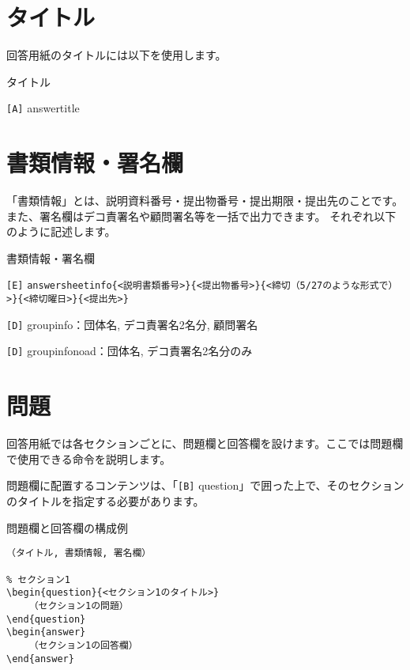 \begin{multicols*}{2}
\section{タイトル}
回答用紙のタイトルには以下を使用します。
\begin{framebox-simple}{タイトル}
    \begin{reitemize}
        \item \verb|[A]| answertitle
    \end{reitemize}
\end{framebox-simple}

\section{書類情報・署名欄}
「書類情報」とは、説明資料番号・提出物番号・提出期限・提出先のことです。また、署名欄はデコ責署名や顧問署名等を一括で出力できます。
それぞれ以下のように記述します。
\begin{framebox-simple}{書類情報・署名欄}
    \begin{reitemize}
        \item \verb|[E]| \verb|answersheetinfo{<説明書類番号>}{<提出物番号>}{<締切（5/27のような形式で）>}{<締切曜日>}{<提出先>}|
        \item \verb|[D]| groupinfo：団体名, デコ責署名2名分, 顧問署名
        \item \verb|[D]| groupinfonoad：団体名, デコ責署名2名分のみ
    \end{reitemize}
\end{framebox-simple}

\section{問題}
回答用紙では各セクションごとに、問題欄と回答欄を設けます。ここでは問題欄で使用できる命令を説明します。

問題欄に配置するコンテンツは、「\verb|[B]| question」で囲った上で、そのセクションのタイトルを指定する必要があります。
\begin{framebox-ref}{問題欄と回答欄の構成例}
\begin{verbatim}
（タイトル, 書類情報, 署名欄）

% セクション1
\begin{question}{<セクション1のタイトル>}
    （セクション1の問題）
\end{question}
\begin{answer}
    （セクション1の回答欄）
\end{answer}
        

\end{verbatim}
\end{framebox-ref}
\end{multicols*}
